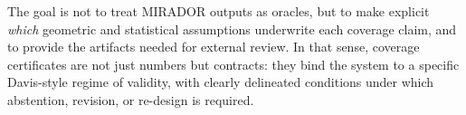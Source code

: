 \documentclass[11pt]{article}
\begin{document}
The goal is not to treat MIRADOR outputs as oracles, but to make explicit \emph{which} geometric and
statistical assumptions underwrite each coverage claim, and to provide the artifacts needed for
external review. In that sense, coverage certificates are not just numbers but contracts: they bind
the system to a specific Davis-style regime of validity, with clearly delineated conditions under
which abstention, revision, or re-design is required.
\end{document}
